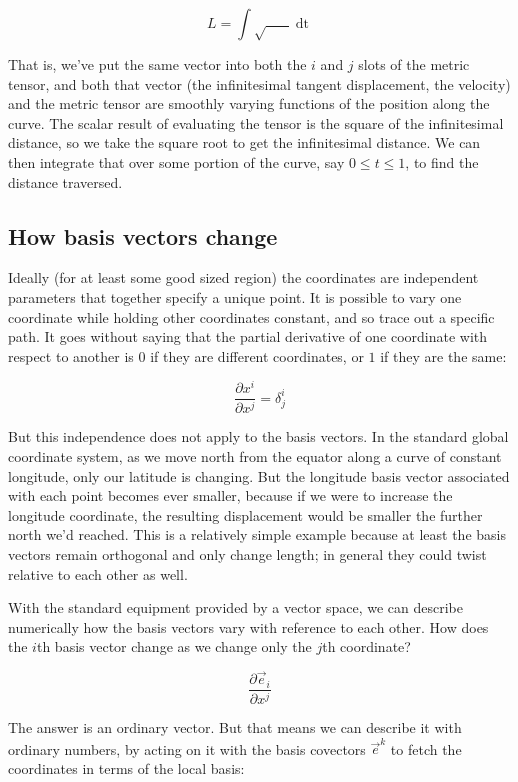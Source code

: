 $$
L =
\int
\sqrt{
    \mathop{g_{ij}(t)}
    \mathop{v^i(t)}
    \mathop{v^j(t)}
}
\mathop{dt}
$$

That is, we've put the same vector into both the $i$ and $j$ slots of the metric tensor, and both that vector (the infinitesimal tangent displacement, the velocity) and the metric tensor are smoothly varying functions of the position along the curve. The scalar result of evaluating the tensor is the square of the infinitesimal distance, so we take the square root to get the infinitesimal distance. We can then integrate that over some portion of the curve, say $0 \le t \le 1$, to find the distance traversed.

\subsection{How basis vectors change}

Ideally (for at least some good sized region) the coordinates are independent parameters that together specify a unique point. It is possible to vary one coordinate while holding other coordinates constant, and so trace out a specific path. It goes without saying that the partial derivative of one coordinate with respect to another is $0$ if they are different coordinates, or $1$ if they are the same:

$$
\frac{\partial x^i}{\partial x^j} = \delta^i_j
$$

But this independence does not apply to the basis vectors. In the standard global coordinate system, as we move north from the equator along a curve of constant longitude, only our latitude is changing. But the longitude basis vector associated with each point becomes ever smaller, because if we were to increase the longitude coordinate, the resulting displacement would be smaller the further north we'd reached. This is a relatively simple example because at least the basis vectors remain orthogonal and only change length; in general they could twist relative to each other as well.

With the standard equipment provided by a vector space, we can describe numerically how the basis vectors vary with reference to each other. How does the $i$th basis vector change as we change only the $j$th coordinate?

$$
\frac{\partial \vec{e}_i}{\partial x^j}
$$

The answer is an ordinary vector. But that means we can describe it with ordinary numbers, by acting on it with the basis covectors $\vec{e}^k$ to fetch the coordinates in terms of the local basis:

